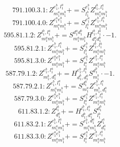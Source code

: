 \documentclass[letterpaper,10pt,fleqn,leqno,onecolumn]{article}
\begin{document}
\begin{equation} \;\;\;\;\;\;  791.100.3.1: Z^{e_{1}^{b},l_{1}^{a}}_{m_{1}^{a}m_{1}^{b}}+=S^{e_{1}^{b}}_{l_{1}^{b}}Z^{l_{1}^{b},l_{1}^{a}}_{m_{1}^{a}m_{1}^{b}} \end{equation}
\begin{equation} \;\;\;\;\;\;  791.100.4.0: Z^{e_{1}^{a}e_{1}^{b}}_{m_{1}^{a}m_{1}^{b}}+=S^{e_{1}^{a}}_{l_{1}^{a}}Z^{e_{1}^{b},l_{1}^{a}}_{m_{1}^{a}m_{1}^{b}} \end{equation}
\begin{equation} \;\;\;\;\;\;  595.81.1.2: Z^{l_{1}^{b},l_{1}^{a}}_{m_{1}^{a}m_{1}^{b}}+=S^{d_{1}^{a}d_{1}^{b}}_{m_{1}^{a}m_{1}^{b}}H^{l_{1}^{b},l_{1}^{a}}_{d_{1}^{a}d_{1}^{b}}\cdot -1. \end{equation}
\begin{equation} \;\;\;\;\;\;  595.81.2.1: Z^{e_{1}^{b},l_{1}^{a}}_{m_{1}^{a}m_{1}^{b}}+=S^{e_{1}^{b}}_{l_{1}^{b}}Z^{l_{1}^{b},l_{1}^{a}}_{m_{1}^{a}m_{1}^{b}} \end{equation}
\begin{equation} \;\;\;\;\;\;  595.81.3.0: Z^{e_{1}^{a}e_{1}^{b}}_{m_{1}^{a}m_{1}^{b}}+=S^{e_{1}^{a}}_{l_{1}^{a}}Z^{e_{1}^{b},l_{1}^{a}}_{m_{1}^{a}m_{1}^{b}} \end{equation}
\begin{equation} \;\;\;\;\;\;  587.79.1.2: Z^{e_{1}^{b},l_{1}^{a}}_{m_{1}^{b},d_{1}^{a}}+=H^{e_{1}^{b},l_{1}^{a}}_{d_{1}^{b},d_{1}^{a}}S^{d_{1}^{b}}_{m_{1}^{b}}\cdot -1. \end{equation}
\begin{equation} \;\;\;\;\;\;  587.79.2.1: Z^{e_{1}^{b},l_{1}^{a}}_{m_{1}^{a}m_{1}^{b}}+=S^{d_{1}^{a}}_{m_{1}^{a}}Z^{e_{1}^{b},l_{1}^{a}}_{m_{1}^{b},d_{1}^{a}} \end{equation}
\begin{equation} \;\;\;\;\;\;  587.79.3.0: Z^{e_{1}^{a}e_{1}^{b}}_{m_{1}^{a}m_{1}^{b}}+=S^{e_{1}^{a}}_{l_{1}^{a}}Z^{e_{1}^{b},l_{1}^{a}}_{m_{1}^{a}m_{1}^{b}} \end{equation}
\begin{equation} \;\;\;\;\;\;  611.83.1.2: Z^{l_{1}^{a}}_{d_{1}^{a}}+=H^{l_{1}^{b},l_{1}^{a}}_{d_{1}^{b},d_{1}^{a}}S^{d_{1}^{b}}_{l_{1}^{b}} \end{equation}
\begin{equation} \;\;\;\;\;\;  611.83.2.1: Z^{e_{1}^{b},l_{1}^{a}}_{m_{1}^{a}m_{1}^{b}}+=S^{e_{1}^{b},d_{1}^{a}}_{m_{1}^{a}m_{1}^{b}}Z^{l_{1}^{a}}_{d_{1}^{a}} \end{equation}
\begin{equation} \;\;\;\;\;\;  611.83.3.0: Z^{e_{1}^{a}e_{1}^{b}}_{m_{1}^{a}m_{1}^{b}}+=S^{e_{1}^{a}}_{l_{1}^{a}}Z^{e_{1}^{b},l_{1}^{a}}_{m_{1}^{a}m_{1}^{b}} \end{equation}
\end{document}
